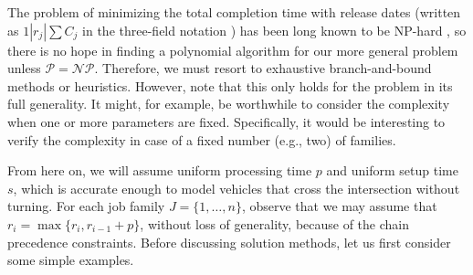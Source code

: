\documentclass{article}
\theoremstyle{definition}
\theoremstyle{plain}
\begin{document}
The problem of minimizing the total completion time with release dates (written
as $1 | r_{j} | \sum C_{j}$ in the three-field notation
\cite{grahamOptimizationApproximationDeterministic1979}) has been long known to
be NP-hard \cite{lenstraComplexityMachineScheduling1977}, so there is no hope in
finding a polynomial algorithm for our more general problem unless
$\mathcal{P} = \mathcal{NP}$. Therefore, we must resort to exhaustive
branch-and-bound methods or heuristics. However, note that this only holds for
the problem in its full generality. It might, for example, be worthwhile to
consider the complexity when one or more parameters are fixed. Specifically, it
would be interesting to verify the complexity in case of a fixed number (e.g.,
two) of families.

From here on, we will assume uniform processing time $p$ and uniform setup time
$s$, which is accurate enough to model vehicles that cross the intersection
without turning. For each job family $J = \{ 1, \dots, n \}$, observe that we
may assume that $r_{i} = \max\{ r_{i}, r_{i-1} + p \}$, without loss of
generality, because of the chain precedence constraints. Before discussing
solution methods, let us first consider some simple examples.
\end{document}
